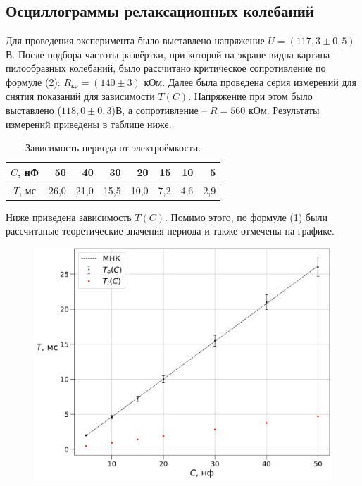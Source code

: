 \documentclass[14pt,a4paper]{article}
\begin{document}
\subsection*{Осциллограммы релаксационных колебаний}

Для проведения эксперимента было выставлено напряжение $U = (117,3 \pm 0,5) $В. После подбора частоты развёртки, при которой на экране видна картина пилообразных колебаний, было рассчитано критическое сопротивление по формуле (2): $R_\text{кр} =  (140 \pm 3)$ кОм. Далее была проведена серия измерений для снятия показаний для зависимости $T(C)$. Напряжение при этом было выставлено ($118,0 \pm 0,3$)В, а сопротивление -- $R = 560$ кОм. Результаты измерений приведены в таблице ниже.
\begin{table}[H]
    \centering
    \begin{tabular}{|c|r|r|r|r|r|r|r|}
    \hline $C$, нФ & 50 & 40 & 30 & 20 & 15 & 10 & 5 \\ \hline
    $T$, мс & 26,0 & 21,0 & 15,5 & 10,0 & 7,2 & 4,6 & 2,9 \\ \hline
    \end{tabular}
    \caption{Зависимость периода от электроёмкости.}
    \label{tec}
\end{table}
Ниже приведена зависимость $T(C)$. Помимо этого, по формуле (1) были рассчитаные теоретические значения периода и также отмечены на графике.

\begin{figure}[H]
    \centering
    \includegraphics[scale=0.75]{T(C).png}
\end{figure}
\end{document}
